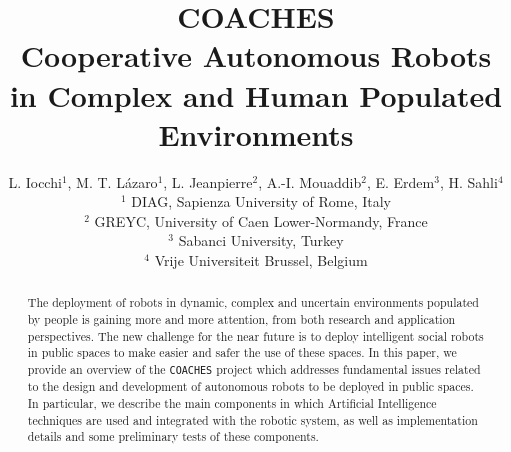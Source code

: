 \documentclass{llncs}
\def\coaches{{\tt COACHES} }
\begin{document}
%
%
%
%
\title{COACHES\\
Cooperative Autonomous Robots in Complex and Human Populated Environments}
%
%
\author{L. Iocchi$^1$,  M. T. L\'azaro$^1$,  L. Jeanpierre$^2$, A.-I. Mouaddib$^2$, E. Erdem$^3$, H. Sahli$^4$ \\
$\,$\\
$^1$ DIAG, %
Sapienza University of Rome, Italy\\
$^2$ GREYC, University of Caen Lower-Normandy, France\\
$^3$ Sabanci University, Turkey \\
$^4$ Vrije Universiteit Brussel, Belgium
}

\institute{}
\date{}

%
%

\maketitle              %

\begin{abstract}

The deployment of robots in dynamic, complex and uncertain environments populated by people is gaining more and more attention, from both research and application perspectives. The new challenge for the near future is to deploy intelligent social robots in public spaces to make easier and safer the use of these spaces. 
In this paper, we provide an overview of the \coaches project which addresses fundamental issues related to the design and development of autonomous robots to be deployed in public spaces. In particular, we describe the main components in which Artificial Intelligence techniques are used and integrated with the robotic system, as well as implementation details and some preliminary tests of these components. 

\end{abstract}



\end{document}
